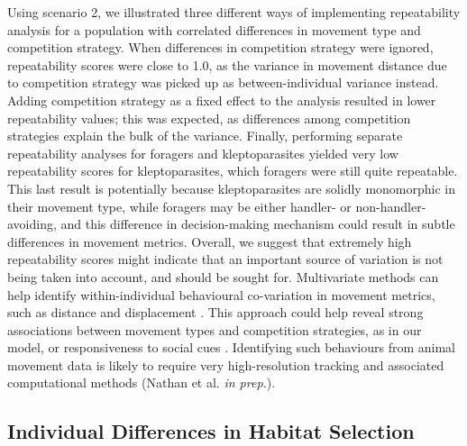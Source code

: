     Using scenario 2, we illustrated three different ways of implementing repeatability analysis for a population with correlated differences in movement type and competition strategy.
    When differences in competition strategy were ignored, repeatability scores were close to 1.0, as the variance in movement distance due to competition strategy was picked up as between-individual variance instead.
    Adding competition strategy as a fixed effect to the analysis resulted in lower repeatability values; this was expected, as differences among competition strategies explain the bulk of the variance.
    Finally, performing separate repeatability analyses for foragers and kleptoparasites yielded very low repeatability scores for kleptoparasites, which foragers were still quite repeatable.
    This last result is potentially because kleptoparasites are solidly monomorphic in their movement type, while foragers may be either handler- or non-handler-avoiding, and this difference in decision-making mechanism could result in subtle differences in movement metrics.
    Overall, we suggest that extremely high repeatability scores might indicate that an important source of variation is not being taken into account, and should be sought for.
    Multivariate methods can help identify within-individual behavioural co-variation in movement metrics, such as distance and displacement \citep{hertel2019,hertel2021}.
    This approach could help reveal strong associations between movement types and competition strategies, as in our model, or responsiveness to social cues \citep{strandburg-peshkin2015}.
    Identifying such behaviours from animal movement data is likely to require very high-resolution tracking and associated computational methods (Nathan et al. \textit{in prep.}).
    
    \subsection*{Individual Differences in Habitat Selection}
    
